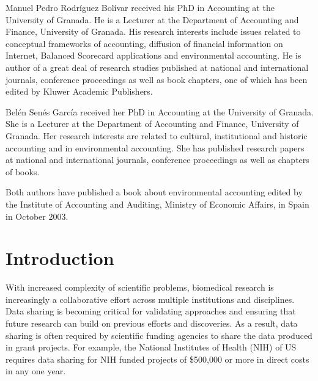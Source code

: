 \documentclass{doublecol-new}
\theoremstyle{TH}{
\newtheorem{lemma}{Lemma}
\newtheorem{theorem}[lemma]{Theorem}
\newtheorem{corrolary}[lemma]{Corrolary}
\newtheorem{conjecture}[lemma]{Conjecture}
\newtheorem{proposition}[lemma]{Proposition}
\newtheorem{claim}[lemma]{Claim}
\newtheorem{stheorem}[lemma]{Wrong Theorem}
\newtheorem{algorithm}{Algorithm}
}
\theoremstyle{THrm}{
\newtheorem{definition}{Definition}[section]
\newtheorem{question}{Question}[section]
\newtheorem{remark}{Remark}
\newtheorem{scheme}{Scheme}
}
\theoremstyle{THhit}{
\newtheorem{case}{Case}[section]
}
\begin{document}
\begin{bio}
Manuel Pedro Rodr\'iguez Bol\'ivar received his PhD in Accounting at
the University of Granada. He is a Lecturer at the Department of
Accounting and Finance, University of Granada. His research
interests include issues related to conceptual frameworks of
accounting, diffusion of financial information on Internet, Balanced
Scorecard applications and environmental accounting. He is author of
a great deal of research studies published at national and
international journals, conference proceedings as well as book
chapters, one of which has been edited by Kluwer Academic
Publishers.

\noindent Bel\'en Sen\'es Garc\'ia received her PhD in Accounting at
the University of Granada. She is a Lecturer at the Department of
Accounting and Finance, University of Granada. Her research
interests are related to cultural, institutional and historic
accounting and in environmental accounting. She has published
research papers at national and international journals, conference
proceedings as well as chapters of books.

\noindent Both authors have published a book about environmental
accounting edited by the Institute of Accounting and Auditing,
Ministry of Economic Affairs, in Spain in October 2003.
\end{bio}


\maketitle


 \section{Introduction}

With increased complexity of scientific problems, biomedical
research is increasingly a collaborative effort across multiple
institutions and disciplines.  Data sharing is becoming critical for
validating approaches and ensuring that future research can build on
previous efforts and discoveries. As a result, data sharing is often
required by scientific funding agencies to share the data produced
in grant projects. For example,  the National Institutes of Health
(NIH) of US requires data sharing for NIH funded projects of
\$500,000 or more in direct costs in any one year.
\end{document}
